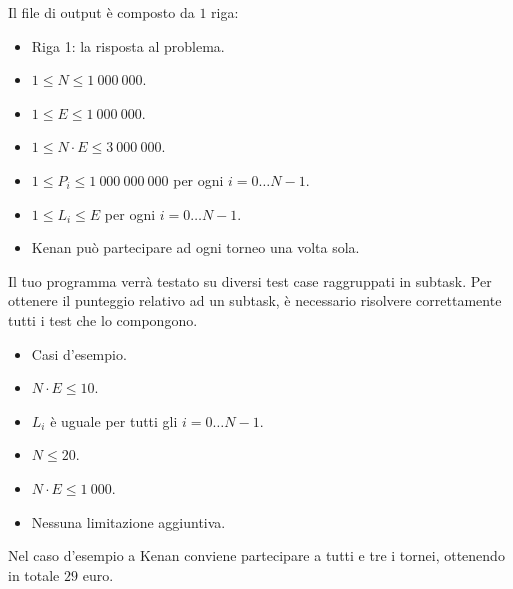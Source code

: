 Il file di output è composto da $1$ riga:
\begin{itemize}
    \item Riga 1: la risposta al problema.
\end{itemize}


\Constraints

\begin{itemize}[nolistsep, itemsep=2mm]
    \item $1 \le N \le 1\:000\:000$.
    \item $1 \le E \le 1\:000\:000$.
    \item $1 \le N \cdot E \le 3\:000\:000$.
    \item $1 \le P_i \le 1\:000\:000\:000$ per ogni $i = 0 \dots N-1$.
    \item $1 \le L_i \le E$ per ogni $i = 0 \dots N-1$.
    \item Kenan può partecipare ad ogni torneo una volta sola.
\end{itemize}


\Scoring

Il tuo programma verrà testato su diversi test case raggruppati in subtask.
Per ottenere il punteggio relativo ad un subtask,
è necessario risolvere correttamente tutti i test che lo compongono.

\begin{itemize}[nolistsep,itemsep=2mm]
    \item \subtask Casi d'esempio.
    \item \subtask $N \cdot E \le 10$.
    \item \subtask $L_i$ è uguale per tutti gli $i = 0 \dots N-1$.
    \item \subtask $N \le 20$.
    \item \subtask $N \cdot E \le 1\:000$.
    \item \subtask Nessuna limitazione aggiuntiva.
\end{itemize}


\Examples

\begin{example}
\end{example}


\Explanation

Nel caso d'esempio a Kenan conviene partecipare a tutti e tre i tornei, ottenendo in totale $29$ euro.
